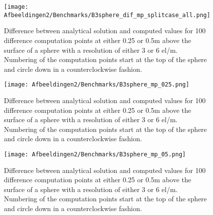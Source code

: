 \begin{figure}
\centering
   \texttt{[image: Afbeeldingen2/Benchmarks/B3sphere\_dif\_mp\_splitcase\_all.png]}
    \caption{Difference between analytical solution and computed values for 100 difference computation points at either 0.25 or 0.5m above the surface of a sphere with a resolution of either 3 or 6 el/m. Numbering of the computation points start at the top of the sphere and circle down in a counterclockwise fashion.  }
    \label{fig:sphere_bench}
\end{figure} 

\begin{figure}
\centering
   \texttt{[image: Afbeeldingen2/Benchmarks/B3sphere\_mp\_025.png]}
    \caption{Difference between analytical solution and computed values for 100 difference computation points at either 0.25 or 0.5m above the surface of a sphere with a resolution of either 3 or 6 el/m.  Numbering of the computation points start at the top of the sphere and circle down in a counterclockwise fashion.  }
    \label{fig:sphere_bench}
\end{figure} 
\begin{figure}
\centering
   \texttt{[image: Afbeeldingen2/Benchmarks/B3sphere\_mp\_05.png]}
    \caption{Difference between analytical solution and computed values for 100 difference computation points at either 0.25 or 0.5m above the surface of a sphere with a resolution of either 3 or 6 el/m. Numbering of the computation points start at the top of the sphere and circle down in a counterclockwise fashion.  }
    \label{fig:sphere_bench}
\end{figure} 

